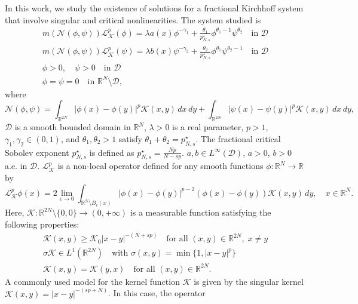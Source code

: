 \documentclass[reqno]{amsart}
\begin{document}
In this work, we study the existence of solutions for a fractional Kirchhoff system 
that involve singular and critical nonlinearities. 
The system studied is
\begin{equation}\label{System}
\begin{gathered}
m(\mathcal{N}(\phi,\psi))\mathcal{L}_\mathcal{K}^p(\phi)
=\lambda a(x)\phi^{-\gamma_1}+\frac{\theta_1}{p^\star_{N,s}}\phi^{\theta_1-1}
\psi^{\theta_2} \quad \text{in } \mathcal{D} \\
m(\mathcal{N}(\phi,\psi))\mathcal{L}_\mathcal{K}^p(\psi)
=\lambda b(x)\psi^{-\gamma_2}+\frac{\theta_2}{p^\star_{N,s}}\phi^{\theta_1}
\psi^{\theta_2-1} \quad \text{in } \mathcal{D} \\
\phi>0,\quad \psi>0  \quad\text{in } \mathcal{D} \\
\phi=\psi=0 \quad \text{in } \mathbb{R}^N\setminus \mathcal{D},
\end{gathered}
\end{equation}
where
$$
\mathcal{N}(\phi,\psi)=\int_{\mathbb{R}^{2N}}|\phi(x)-\phi(y)|^p \mathcal{K}(x,y)\,dx\,dy
+\int_{\mathbb{R}^{2N}}|\psi(x)-\psi(y)|^p\mathcal{K}(x,y)\,dx\,dy,
$$
$\mathcal{D}$ is a smooth bounded domain in $\mathbb{R}^N$, $\lambda>0$ is a real 
parameter, $p>1$, $\gamma_1,\gamma_2\in (0,1)$, and $\theta_1,\theta_2>1$ satisfy 
$\theta_1+\theta_2=p^\star_{N,s}$. 
The fractional critical Sobolev exponent $p^\star_{N,s}$ is defined as 
$p^\star_{N,s}=\frac{Np}{N-sp}$. 
$a,b\in L^\infty(\mathcal{D})$, $a>0$, $b>0$ a.e. in $\mathcal{D}$. 
$\mathcal{L}_\mathcal{K}^p$ is a non-local operator defined for any smooth functions 
$\phi:\mathbb{R}^N\to\mathbb{R}$ by
$$
\mathcal{L}_\mathcal{K}^p\phi(x)
=2\lim_{\epsilon\to 0}\int_{\mathbb{R}^N\setminus B_\epsilon(x)}
|\phi(x)-\phi(y)|^{p-2}(\phi(x)-\phi(y))\mathcal{K}(x,y)\,dy,\quad x\in \mathbb{R}^N.
$$
Here, $\mathcal{K}:\mathbb{R}^{2N}\setminus \{0,0\}\to (0,+\infty)$ is a
 measurable function satisfying the following properties:
\begin{gather*}
\mathcal{K}(x,y)\geq \mathcal{K}_0|x-y|^{-(N+sp)}\quad
 \text{for all } (x,y)\in \mathbb{R}^{2N},\; x\neq y\\
\sigma\mathcal{K}\in L^1(\mathbb{R}^{2N})\quad \text{with }
 \sigma(x,y)=\min\{1,|x-y|^p\}\\
\mathcal{K}(x,y)=\mathcal{K}(y,x)\quad\text{for all } (x,y)\in \mathbb{R}^{2N}.
\end{gather*}
A commonly used model for the kernel function $\mathcal{K}$ is given by the singular 
kernel $\mathcal{K}(x,y)=|x-y|^{-(sp+N)}$. In this case, the operator 
\end{document}
